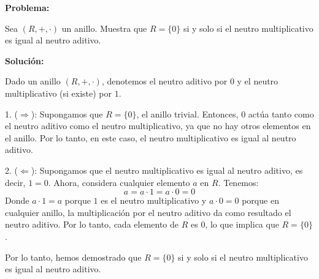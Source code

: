\documentclass{article}
\begin{document}
\textbf{Problema:}

Sea \( (R, +, \cdot) \) un anillo. Muestra que \( R = \{0\} \) si y solo si el neutro multiplicativo es igual al neutro aditivo.

\textbf{Solución:}

Dado un anillo \( (R, +, \cdot) \), denotemos el neutro aditivo por \( 0 \) y el neutro multiplicativo (si existe) por \( 1 \).

1. (\( \Rightarrow \)): Supongamos que \( R = \{0\} \), el anillo trivial. Entonces, \( 0 \) actúa tanto como el neutro aditivo como el neutro multiplicativo, ya que no hay otros elementos en el anillo. Por lo tanto, en este caso, el neutro multiplicativo es igual al neutro aditivo.

2. (\( \Leftarrow \)): Supongamos que el neutro multiplicativo es igual al neutro aditivo, es decir, \( 1 = 0 \). Ahora, considera cualquier elemento \( a \) en \( R \). Tenemos:
\[
a = a \cdot 1 = a \cdot 0 = 0 
\]
Donde \( a \cdot 1 = a \) porque \( 1 \) es el neutro multiplicativo y \( a \cdot 0 = 0 \) porque en cualquier anillo, la multiplicación por el neutro aditivo da como resultado el neutro aditivo. Por lo tanto, cada elemento de \( R \) es \( 0 \), lo que implica que \( R = \{0\} \).

Por lo tanto, hemos demostrado que \( R = \{0\} \) si y solo si el neutro multiplicativo es igual al neutro aditivo.
\end{document}
